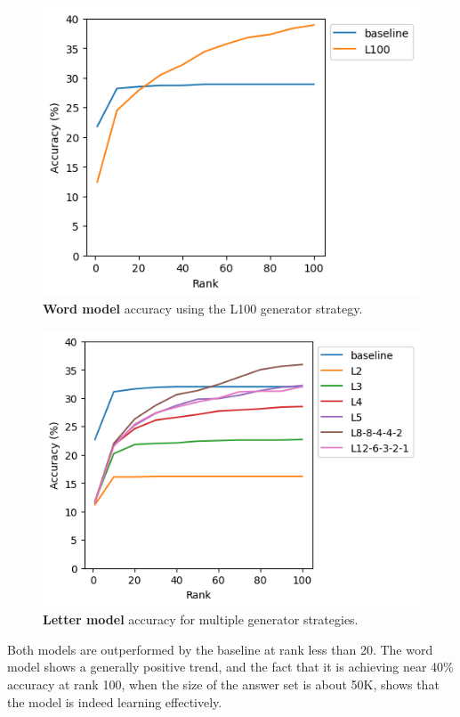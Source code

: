 \documentclass[letterpaper]{article} %
\begin{document}
\begin{NoHyper}
\begin{figure}
\centering
\includegraphics[width=0.91\columnwidth]{fig-onemark-acc-by-strat}
\caption{\textbf{Word model} accuracy using the L100 generator strategy.}
\label{fig:onemark-acc-by-strat}
\end{figure}

\begin{figure}
\centering
\includegraphics[width=0.95\columnwidth]{fig-charmark-accuracy-embsize256}
\caption{\textbf{Letter model} accuracy for multiple generator strategies.}
\label{fig:charmark-acc-by-strat}
\end{figure}

Both models are outperformed by the baseline at rank less than 20.
The word model shows a generally positive trend, and the fact that it is achieving near 40\% accuracy at rank 100, when the size of the answer set is about 50K, shows that the model is indeed learning effectively.


\end{NoHyper}
\end{document}
